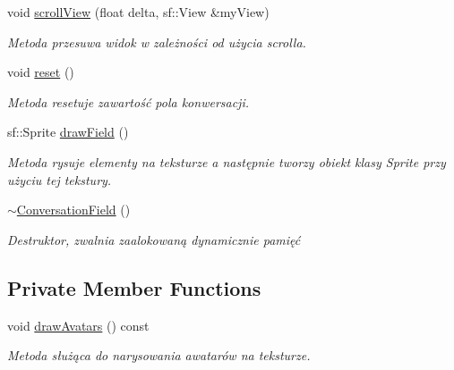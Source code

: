 \begin{DoxyCompactItemize}
void \mbox{\hyperlink{class_conversation_field_a562947edbd37166d1a224cb3a92692ea}{scroll\+View}} (float delta, sf\+::\+View \&my\+View)
\begin{DoxyCompactList}\small\item\em Metoda przesuwa widok w zależności od użycia scrolla. \end{DoxyCompactList}\item 
\mbox{\label{class_conversation_field_addd22a34e52b02b8f27eb59415d81739}} 
void \mbox{\hyperlink{class_conversation_field_addd22a34e52b02b8f27eb59415d81739}{reset}} ()
\begin{DoxyCompactList}\small\item\em Metoda resetuje zawartość pola konwersacji. \end{DoxyCompactList}\item 
sf\+::\+Sprite \mbox{\hyperlink{class_conversation_field_a4507394fc857ea473c69e75c81b44eb3}{draw\+Field}} ()
\begin{DoxyCompactList}\small\item\em Metoda rysuje elementy na teksturze a następnie tworzy obiekt klasy Sprite przy użyciu tej tekstury. \end{DoxyCompactList}\item 
\mbox{\label{class_conversation_field_ab7d6dfc11246d78a25e5892f4567fcd7}} 
\mbox{\hyperlink{class_conversation_field_ab7d6dfc11246d78a25e5892f4567fcd7}{$\sim$\+Conversation\+Field}} ()
\begin{DoxyCompactList}\small\item\em Destruktor, zwalnia zaalokowaną dynamicznie pamięć \end{DoxyCompactList}\end{DoxyCompactItemize}
\subsection*{Private Member Functions}
\begin{DoxyCompactItemize}
\item 
\mbox{\label{class_conversation_field_af099ef6913a8a34e88a8b055aa7ba219}} 
void \mbox{\hyperlink{class_conversation_field_af099ef6913a8a34e88a8b055aa7ba219}{draw\+Avatars}} () const
\begin{DoxyCompactList}\small\item\em Metoda służąca do narysowania awatarów na teksturze. \end{DoxyCompactList}\end{DoxyCompactItemize}
